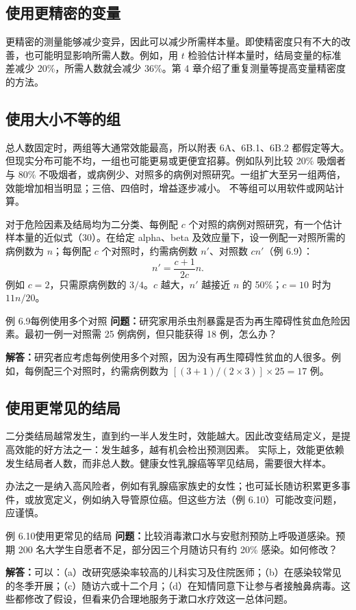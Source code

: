 \subsection{使用更精密的变量}
更精密的测量能够减少变异，因此可以减少所需样本量。即使精密度只有不大的改善，也可能明显影响所需人数。例如，用 $t$ 检验估计样本量时，结局变量的标准差减少 20\%，所需人数就会减少 36\%。第 4 章介绍了重复测量等提高变量精密度的方法。

\subsection{使用大小不等的组}
总人数固定时，两组等大通常效能最高，所以附表 6A、6B.1、6B.2 都假定等大。但现实分布可能不均，一组也可能更易或更便宜招募。例如队列比较 20\% 吸烟者与 80\% 不吸烟者，或病例少、对照多的病例对照研究。一组扩大至另一组两倍，效能增加相当明显；三倍、四倍时，增益逐步减小。
不等组可以用软件或网站计算。

对于危险因素及结局均为二分类、每例配 $c$ 个对照的病例对照研究，有一个估计样本量的近似式（30）。在给定 alpha、beta 及效应量下，设一例配一对照所需的病例数为 $n$；每例配 $c$ 个对照时，约需病例数 $n'$、对照数 $cn'$（例 6.9）：
\[
n'=\frac{c+1}{2c}n.
\]
例如 $c=2$，只需原病例数的 $3/4$。$c$ 越大，$n'$ 越接近 $n$ 的 50\%；$c=10$ 时为 $11n/20$。
\begin{bookbox}{例 6.9\quad 每例使用多个对照}
\textbf{问题：}研究家用杀虫剂暴露是否为再生障碍性贫血危险因素。最初一例一对照需 25 例病例，但只能获得 18 例，怎么办？

\textbf{解答：}研究者应考虑每例使用多个对照，因为没有再生障碍性贫血的人很多。例如，每例配三个对照时，约需病例数为 $[(3+1)/(2\times3)]\times25=17$ 例。
\end{bookbox}

\subsection{使用更常见的结局}
二分类结局越常发生，直到约一半人发生时，效能越大。因此改变结局定义，是提高效能的好方法之一：发生越多，越有机会检出预测因素。
实际上，效能更依赖发生结局者人数，而非总人数。健康女性乳腺癌等罕见结局，需要很大样本。

办法之一是纳入高风险者，例如有乳腺癌家族史的女性；也可延长随访积累更多事件，或放宽定义，例如纳入导管原位癌。但这些方法（例 6.10）可能改变问题，应谨慎。
\begin{bookbox}{例 6.10\quad 使用更常见的结局}
\textbf{问题：}比较消毒漱口水与安慰剂预防上呼吸道感染。预期 200 名大学生自愿者不足，部分因三个月随访只有约 20\% 感染。如何修改？

\textbf{解答：}可以：（a）改研究感染率较高的儿科实习及住院医师；（b）在感染较常见的冬季开展；（c）随访六或十二个月；（d）在知情同意下让参与者接触鼻病毒。这些都修改了假设，但看来仍合理地服务于漱口水疗效这一总体问题。
\end{bookbox}

